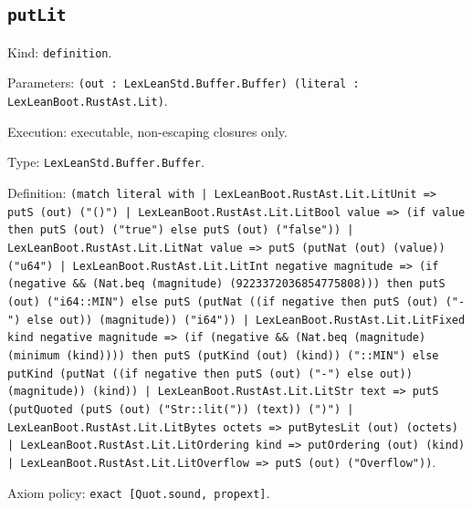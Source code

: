 \documentclass[11pt]{article}
\begin{document}
\subsection*{\texttt{putLit}}
\noindent Kind: \texttt{definition}.\par
\noindent Parameters: \texttt{(out : LexLeanStd.Buffer.Buffer) (literal : LexLeanBoot.RustAst.Lit)}.\par
\noindent Execution: executable, non-escaping closures only.\par
\noindent Type: \texttt{LexLeanStd.Buffer.Buffer}.\par
\noindent Definition: \texttt{(match literal with | LexLeanBoot.RustAst.Lit.LitUnit => putS (out) ("()") | LexLeanBoot.RustAst.Lit.LitBool value => (if value then putS (out) ("true") else putS (out) ("false")) | LexLeanBoot.RustAst.Lit.LitNat value => putS (putNat (out) (value)) ("u64") | LexLeanBoot.RustAst.Lit.LitInt negative magnitude => (if (negative \&\& (Nat.beq (magnitude) (9223372036854775808))) then putS (out) ("i64::MIN") else putS (putNat ((if negative then putS (out) ("-") else out)) (magnitude)) ("i64")) | LexLeanBoot.RustAst.Lit.LitFixed kind negative magnitude => (if (negative \&\& (Nat.beq (magnitude) (minimum (kind)))) then putS (putKind (out) (kind)) ("::MIN") else putKind (putNat ((if negative then putS (out) ("-") else out)) (magnitude)) (kind)) | LexLeanBoot.RustAst.Lit.LitStr text => putS (putQuoted (putS (out) ("Str::lit(")) (text)) (")") | LexLeanBoot.RustAst.Lit.LitBytes octets => putBytesLit (out) (octets) | LexLeanBoot.RustAst.Lit.LitOrdering kind => putOrdering (out) (kind) | LexLeanBoot.RustAst.Lit.LitOverflow => putS (out) ("Overflow"))}.\par
\noindent Axiom policy: \texttt{exact [Quot.sound, propext]}.\par
\end{document}

